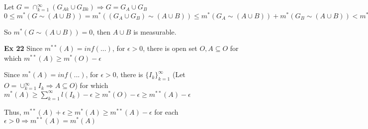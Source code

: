 Let $G = \cap_{k=1}^{\infty}(G_{Ak} \cup G_{Bk}) \Rightarrow G = G_A \cup G_B$\\
$0 \leq m^*(G \sim (A \cup B)) = m^*((G_A \cup G_B) \sim (A \cup B)) \leq m^*(G_A \sim (A \cup B)) + m^*(G_B \sim (A \cup B)) < m^*(G_A \sim A) + m^*(G_B \sim B) = 0$

So $m^*(G \sim (A \cup B)) = 0$, then $A \cup B$ is measurable.

\textbf{Ex 22}
Since $m^{**}(A) = inf(...)$, for $\epsilon > 0$, there is open set $O, A \subseteq O$ for which $m^{**}(A) \geq m^*(O) - \epsilon$

Since $m^*(A) = inf(...)$, for $\epsilon > 0$, there is $\{I_k\}_{k=1}^{\infty}$ (Let $O = \cup^{\infty}_{k=1}I_k \Rightarrow A \subseteq O$) for which\\
$m^*(A) \geq \sum_{k=1}^{\infty}l(I_k) - \epsilon \geq m^*(O) - \epsilon \geq m^{**}(A) - \epsilon$

Thus, $m^{**}(A) + \epsilon \geq m^*(A) \geq m^{**}(A) - \epsilon$ for each $\epsilon > 0 \Rightarrow m^{**}(A) = m^*(A)$
